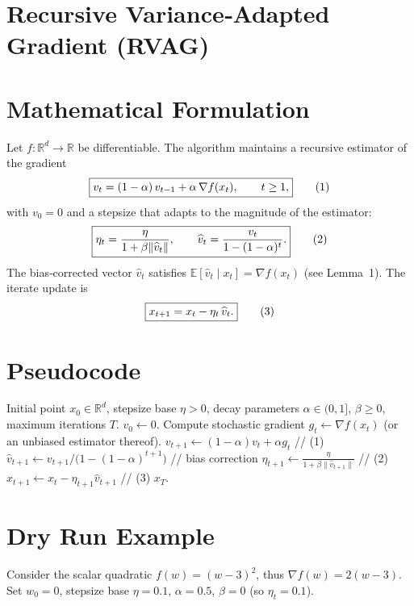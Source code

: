 \documentclass{article}
\newcommand{\E}{\mathbb{E}}
\newcommand{\R}{\mathbb{R}}
\begin{document}
\section*{Recursive Variance‑Adapted Gradient (RVAG) }

\section*{Mathematical Formulation}
Let $f:\R^{d}\rightarrow\R$ be differentiable.  
The algorithm maintains a recursive estimator of the gradient
\[
\boxed{%
v_{t}= (1-\alpha)\,v_{t-1}+ \alpha\,\nabla f(x_{t}) ,\qquad t\ge 1,
}
\tag{1}
\]
with $v_{0}=0$ and a stepsize that adapts to the magnitude of the estimator:
\[
\boxed{%
\eta_{t}= \frac{\eta}{1+\beta\| \widehat v_{t}\|},\qquad 
\widehat v_{t}= \frac{v_{t}}{1-(1-\alpha)^{t}} .
}
\tag{2}
\]
The bias‑corrected vector $\widehat v_{t}$ satisfies $\E[\widehat v_{t}\mid x_{t}]=\nabla f(x_{t})$ (see Lemma~1).  
The iterate update is
\[
\boxed{%
x_{t+1}=x_{t}-\eta_{t}\,\widehat v_{t}.
}
\tag{3}
\]

\section*{Pseudocode}
\begin{algorithm}[H]
\caption{Recursive Variance‑Adapted Gradient (RVAG)}
\begin{algorithmic}[1]
\Require Initial point $x_{0}\in\R^{d}$, stepsize base $\eta>0$, 
decay parameters $\alpha\in(0,1]$, $\beta\ge0$, maximum iterations $T$.
\State $v_{0}\gets 0$.
    \State Compute stochastic gradient $g_{t}\gets\nabla f(x_{t})$  
          (or an unbiased estimator thereof).
    \State $v_{t+1}\gets (1-\alpha)v_{t}+ \alpha g_{t}$ \hfill // (1)
    \State $\widehat v_{t+1}\gets v_{t+1}/\bigl(1-(1-\alpha)^{t+1}\bigr)$ \hfill // bias correction
    \State $\eta_{t+1}\gets \displaystyle\frac{\eta}{1+\beta\|\widehat v_{t+1}\|}$ \hfill // (2)
    \State $x_{t+1}\gets x_{t}-\eta_{t+1}\widehat v_{t+1}$ \hfill // (3)
\EndFor
\State \Return $x_{T}$.
\end{algorithmic}
\end{algorithm}

\section*{Dry Run Example}
Consider the scalar quadratic $f(w)=(w-3)^{2}$, thus $\nabla f(w)=2(w-3)$.  
Set $w_{0}=0$, stepsize base $\eta=0.1$, $\alpha=0.5$, $\beta=0$ (so $\eta_{t}=0.1$).  
\end{document}
